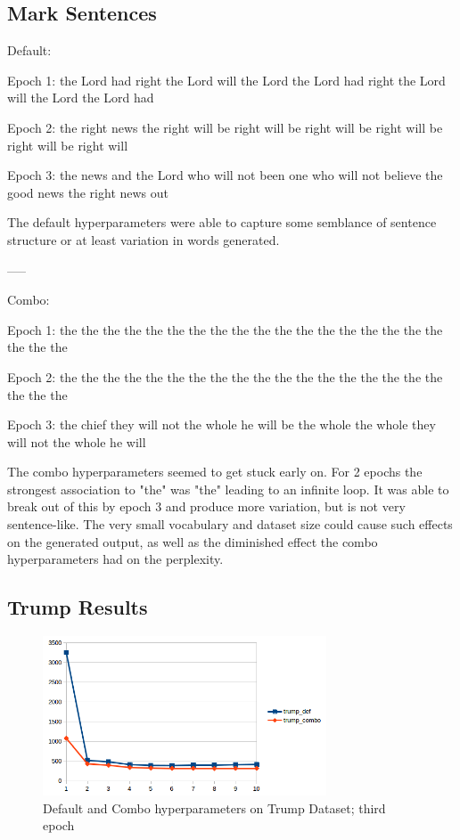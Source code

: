 \documentclass[10pt,a4paper]{article}
\begin{document}
\subsection{Mark Sentences}
Default:


Epoch 1: the Lord had right the Lord will the Lord the Lord had right the Lord will the Lord the Lord had

Epoch 2: the right news the right will be right will be right will be right will be right will be right will

Epoch 3: the news and the Lord who will not been one who will not believe the good news the right news out

The default hyperparameters were able to capture some semblance of sentence structure or at least variation in words generated.

-----

Combo:


Epoch 1: the the the the the the the the the the the the the the the the the the the the the

Epoch 2: the the the the the the the the the the the the the the the the the the the the the

Epoch 3: the chief they will not the whole he will be the whole the whole they will not the whole he will

The combo hyperparameters seemed to get stuck early on. For 2 epochs the strongest association to "the" was "the" leading to an infinite loop. It was able to break out of this by epoch 3 and produce more variation, but is not very sentence-like. The very small vocabulary and dataset size could cause such effects on the generated output, as well as the diminished effect the combo hyperparameters had on the perplexity.

\subsection{Trump Results}

\begin{figure}[H]
  \begin{center}
    \includegraphics[width=0.75\textwidth] {trump1.png}
    \caption{Default and Combo hyperparameters on Trump Dataset; third epoch}
  \end{center}
\end{figure}
\end{document}
